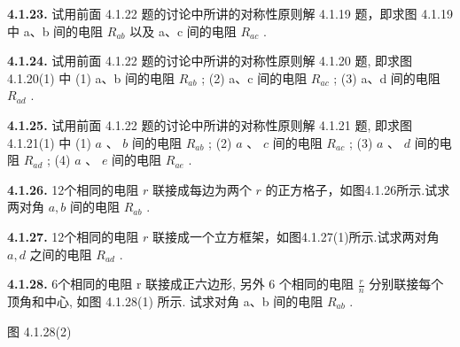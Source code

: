 \vfill
\newpage

\textbf{4.1.23.} 试用前面 4.1.22 题的讨论中所讲的对称性原则解 4.1.19 题，即求图 4.1.19 中 a、b 间的电阻 $R_{ab}$ 以及 a、c 间的电阻 $R_{ac}$ .

\begin{center}
\end{center}

\vfill
\newpage

\textbf{4.1.24.} 试用前面 4.1.22 题的讨论中所讲的对称性原则解 4.1.20 题, 即求图 4.1.20(1) 中 (1) a、b 间的电阻 $R_{ab}$ ; (2) a、c 间的电阻 $R_{ac}$ ; (3) a、d 间的电阻 $R_{ad}$ .

\begin{center}
\end{center}

\vfill
\newpage

\textbf{4.1.25.} 试用前面 4.1.22 题的讨论中所讲的对称性原则解 4.1.21 题, 即求图 4.1.21(1) 中 (1) $a$ 、 $b$ 间的电阻 $R_{ab}$ ; (2) $a$ 、 $c$ 间的电阻 $R_{ac}$ ; (3) $a$ 、 $d$ 间的电阻 $R_{ad}$ ; (4) $a$ 、 $e$ 间的电阻 $R_{ae}$ .

\vfill
\newpage

\textbf{4.1.26.} 12个相同的电阻 $r$ 联接成每边为两个 $r$ 的正方格子，如图4.1.26所示.试求两对角 $a, b$ 间的电阻 $R_{ab}$ .

\vfill
\newpage

\textbf{4.1.27.} 12个相同的电阻 $r$ 联接成一个立方框架，如图4.1.27(1)所示.试求两对角 $a, d$ 之间的电阻 $R_{ad}$ .

\begin{center}
\end{center}

\vfill
\newpage

\textbf{4.1.28.} 6个相同的电阻 r 联接成正六边形, 另外 6 个相同的电阻 $\displaystyle \frac{r}{n}$ 分别联接每个顶角和中心, 如图 4.1.28(1) 所示. 试求对角 a、b 间的电阻 $R_{ab}$ .

图 4.1.28(2)

\begin{center}
  \begin{minipage}[b]{0.47\linewidth}
    \centering
  \end{minipage}\hfill
  \begin{minipage}[b]{0.47\linewidth}
    \centering
  \end{minipage}
\end{center}

